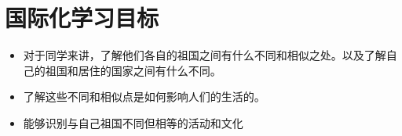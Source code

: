 \chapter{国际化学习目标}


\begin{itemize}
  \item 对于同学来讲，了解他们各自的祖国之间有什么不同和相似之处。以及了解自己的祖国和居住的国家之间有什么不同。
  \item 了解这些不同和相似点是如何影响人们的生活的。
  \item 能够识别与自己祖国不同但相等的活动和文化
\end{itemize}
